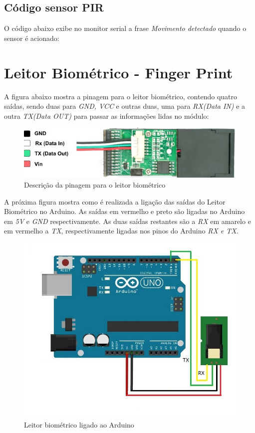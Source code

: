 \documentclass[13pt,a4]{article}
\begin{document}
\subsection{Código sensor PIR}
 	O código abaixo exibe no monitor serial a frase \textit{Movimento detectado} quando o sensor é acionado: 
 
 
 
\section{Leitor Biométrico - Finger Print}

	A figura abaixo mostra a pinagem para o leitor biométrico, contendo quatro saídas, sendo duas para \textit{ GND, VCC} e outras duas, uma para \textit{RX(Data IN)} e a outra \textit{TX(Data OUT)} para passar as informações lidas no módulo: 

\begin{figure}[!htb]
	\centering
	\includegraphics[scale=0.50]{fingerPin.png}
	\caption{  Descrição da pinagem para o leitor biométrico}
	\label{}
\end{figure}

	A próxima figura mostra como é realizada  a ligação das saídas do Leitor Biométrico  no Arduino. As saídas em vermelho e preto são ligadas no Arduino em \textit{5V} e \textit{GND} respectivamente. As duas saídas  restantes são a \textit{RX} em amarelo e em vermelho a \textit{TX}, respectivamente ligadas nos pinos do Arduino  \textit{RX e TX}.

\begin{figure}[!htb]
	\centering
	\includegraphics[scale=0.40]{finger2.jpg}
	\caption{ Leitor biométrico ligado ao Arduino	}
	\label{}
\end{figure}
 
\end{document}
